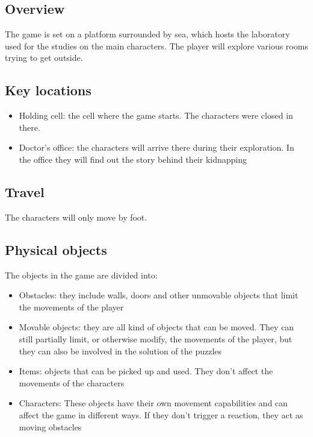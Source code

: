 \subsection{Overview}
The game is set on a platform surrounded by sea, which hosts the laboratory used for the studies 
on the main characters. The player will explore various rooms trying to get outside.
\subsection{Key locations}
\begin {itemize}
	\item Holding cell: the cell where the game starts. The characters were closed in there.
	\item Doctor's office: the characters will arrive there during their exploration. In the office they will find out the story behind their kidnapping
\end {itemize}
\subsection{Travel}
The characters will only move by foot.
\subsection{Physical objects}
The objects in the game are divided into:
\begin {itemize}
	\item Obstacles: they include walls, doors and other unmovable objects that limit the movements of the player
	\item Movable objects: they are all kind of objects that can be moved. They can still partially limit, or otherwise modify, the movements of the player, but they can also be involved in the solution of the puzzles
	\item Items: objects that can be picked up and used. They don't affect the movements of the characters
	\item Characters: These objects have their own movement capabilities and can affect the game in different ways. If they don't trigger a reaction, they act as moving obstacles
\end {itemize}
